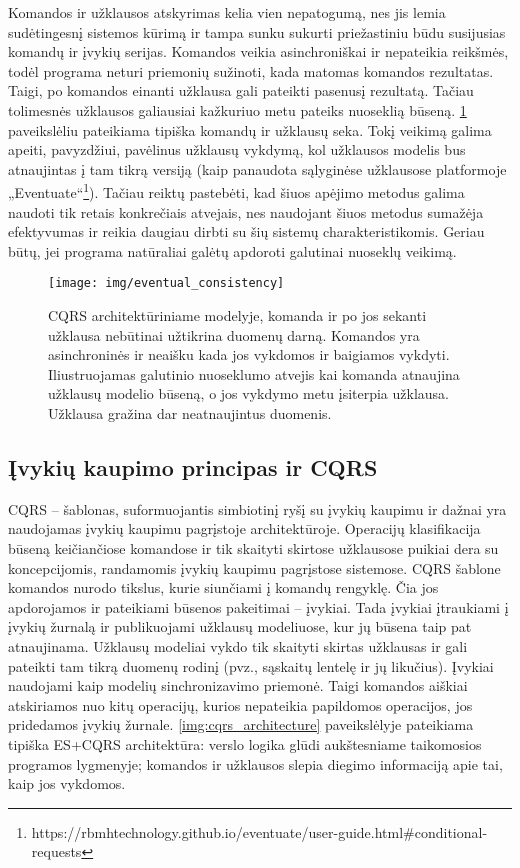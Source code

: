Komandos ir užklausos atskyrimas kelia vien nepatogumą, nes jis lemia sudėtingesnį sistemos kūrimą ir tampa sunku sukurti priežastiniu būdu susijusias komandų ir įvykių serijas. Komandos veikia asinchroniškai ir nepateikia reikšmės, todėl programa neturi priemonių sužinoti, kada matomas komandos rezultatas. Taigi, po komandos einanti užklausa gali pateikti pasenusį rezultatą. Tačiau tolimesnės užklausos galiausiai kažkuriuo metu pateiks nuoseklią būseną. \ref{img:eventual_consistency} paveikslėliu pateikiama tipiška komandų ir užklausų seka. Tokį veikimą galima apeiti, pavyzdžiui, pavėlinus užklausų vykdymą, kol užklausos modelis bus atnaujintas į tam tikrą versiją (kaip panaudota sąlyginėse užklausose platformoje „Eventuate“\footnote{https://rbmhtechnology.github.io/eventuate/user-guide.html\#conditional-requests}). Tačiau reiktų pastebėti, kad šiuos apėjimo metodus galima naudoti tik retais konkrečiais atvejais, nes naudojant šiuos metodus sumažėja efektyvumas ir reikia daugiau dirbti su šių sistemų charakteristikomis. Geriau būtų, jei programa natūraliai galėtų apdoroti galutinai nuoseklų veikimą.

\begin{figure}[H]
    \centering
    \texttt{[image: img/eventual\_consistency]}
    \caption{CQRS architektūriniame modelyje, komanda ir po jos sekanti užklausa nebūtinai užtikrina duomenų darną. Komandos yra asinchroninės ir neaišku kada jos vykdomos ir baigiamos vykdyti. Iliustruojamas galutinio nuoseklumo atvejis kai komanda atnaujina užklausų modelio būseną, o jos vykdymo metu įsiterpia užklausa. Užklausa gražina dar neatnaujintus duomenis.}
    \label{img:eventual_consistency}
\end{figure}

\subsection{Įvykių kaupimo principas ir CQRS}

CQRS – šablonas, suformuojantis simbiotinį ryšį su įvykių kaupimu ir dažnai yra naudojamas įvykių kaupimu pagrįstoje architektūroje. Operacijų klasifikacija būseną keičiančiose komandose ir tik skaityti skirtose užklausose puikiai dera su koncepcijomis, randamomis įvykių kaupimu pagrįstose sistemose. CQRS šablone komandos nurodo tikslus, kurie siunčiami į komandų rengyklę. Čia jos apdorojamos ir pateikiami būsenos pakeitimai – įvykiai. Tada įvykiai įtraukiami į įvykių žurnalą ir publikuojami užklausų modeliuose, kur jų būsena taip pat atnaujinama. Užklausų modeliai vykdo tik skaityti skirtas užklausas ir gali pateikti tam tikrą duomenų rodinį (pvz., sąskaitų lentelę ir jų likučius). Įvykiai naudojami kaip modelių sinchronizavimo priemonė. Taigi komandos aiškiai atskiriamos nuo kitų operacijų, kurios nepateikia papildomos operacijos, jos pridedamos įvykių žurnale. \ref{img:cqrs_architecture} paveikslėlyje pateikiama tipiška ES+CQRS architektūra: verslo logika glūdi aukštesniame taikomosios programos lygmenyje; komandos ir užklausos slepia diegimo informaciją apie tai, kaip jos vykdomos.


